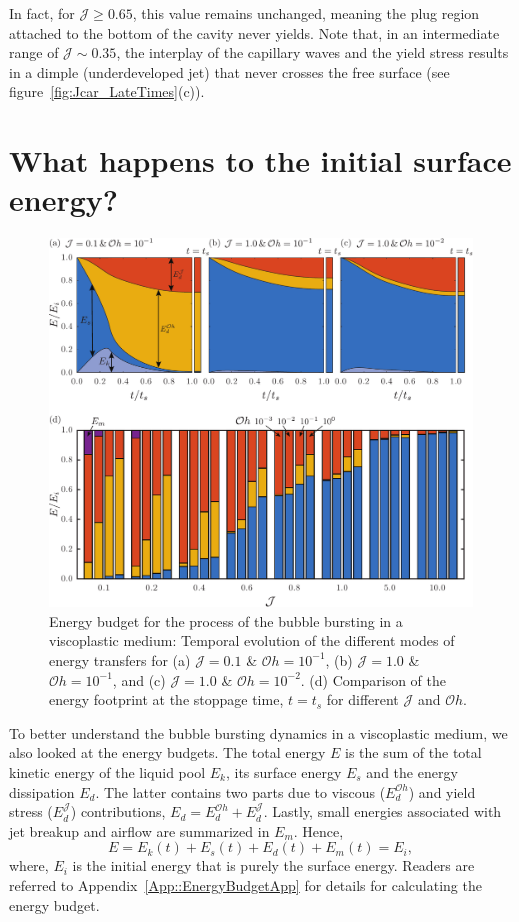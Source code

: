 \documentclass[final]{jfm}
\begin{document}
In fact, for $\mathcal{J} \ge 0.65$, this value remains unchanged, meaning the plug region attached to the bottom of the cavity never yields. Note that, in an intermediate range of $\mathcal{J} \sim 0.35$, the interplay of the capillary waves and the yield stress results in a dimple (underdeveloped jet) that never crosses the free surface (see figure~\ref{fig:Jcar_LateTimes}(c)). 

\section{What happens to the initial surface energy?}\label{Sec::Energy}
\begin{figure}
	\centerline{\includegraphics[width=\linewidth]{Figure5-EnergyBudgets-eps-converted-to.pdf}}%
	\caption{Energy budget for the process of the bubble bursting in a viscoplastic medium: Temporal evolution of the different modes of energy transfers for (a) $\mathcal{J} =0.1$ \& $\mathcal{O}h =10^{-1}$, (b) $\mathcal{J} = 1.0$ \& $\mathcal{O}h =10^{-1}$, and (c) $\mathcal{J} =1.0$ \& $\mathcal{O}h =10^{-2}$. (d) Comparison of the energy footprint at the stoppage time, $t = t_s$ for different $\mathcal{J}$ and $\mathcal{O}h$.}
	\label{fig:EnergyBudget}
\end{figure}
To better understand the bubble bursting dynamics in a viscoplastic medium, we also looked at the energy budgets. The total energy $E$ is the sum of the total kinetic energy of the liquid pool $E_k$, its surface energy $E_s$ and the energy dissipation $E_d$. The latter contains two parts due to viscous ($E_d^{\mathcal{O}h}$) and yield stress ($E_d^\mathcal{J}$) contributions, $E_d = E_d^{\mathcal{O}h} +E_d^\mathcal{J}$. Lastly, small energies associated with jet breakup and airflow are summarized in $E_m$. Hence,
\begin{equation}\label{Eqn::ETotal}
E = E_k(t) + E_s(t) + E_d(t) + E_m(t) = E_i,
\end{equation}
where, $E_i$ is the initial energy that is purely the surface energy. Readers are referred to Appendix~\ref{App::EnergyBudgetApp} for details for calculating the energy budget. 
\end{document}
